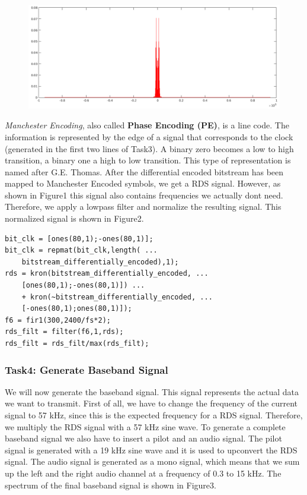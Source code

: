 \documentclass[sigconf]{acmart}
\begin{document}
\begin{figure}[tb!]
	\includegraphics[width=1\linewidth]{rds_filt_plot.png}
	\caption{}
	\label{fig:rds_filt_plot}
\end{figure}

\emph{Manchester Encoding}, also called
\protect\hypertarget{Phaseux20Encodingux20ux28PEux29}{}{}\textbf{Phase
Encoding (PE)}, is a line code. The information is represented by the
edge of a signal that corresponds to the clock (generated in the first
two lines of Task3). A binary zero becomes a low to high transition, a
binary one a high to low transition. This type of representation is
named after G.E. Thomas. After the differential encoded bitstream has
been mapped to Manchester Encoded symbols, we get a RDS signal. However,
as shown in Figure1 this signal also contains frequencies we actually
dont need. Therefore, we apply a lowpass filter and normalize the
resulting signal. This normalized signal is shown in Figure2.

\begin{verbatim}
bit_clk = [ones(80,1);-ones(80,1)];
bit_clk = repmat(bit_clk,length( ...
    bitstream_differentially_encoded),1);
rds = kron(bitstream_differentially_encoded, ...
    [ones(80,1);-ones(80,1)]) ...
    + kron(~bitstream_differentially_encoded, ...
    [-ones(80,1);ones(80,1)]);
f6 = fir1(300,2400/fs*2);
rds_filt = filter(f6,1,rds);
rds_filt = rds_filt/max(rds_filt);
\end{verbatim}

\hypertarget{Task4:ux20Generateux20Basebandux20Signal}{%
\subsubsection{Task4: Generate Baseband
Signal}\label{Task4:ux20Generateux20Basebandux20Signal}}

We will now generate the baseband signal. This signal represents the
actual data we want to transmit. First of all, we have to change the
frequency of the current signal to 57 kHz, since this is the expected
frequency for a RDS signal. Therefore, we multiply the RDS signal with a
57 kHz sine wave. To generate a complete baseband signal we also have to
insert a pilot and an audio signal. The pilot signal is generated with a
19 kHz sine wave and it is used to upconvert the RDS signal. The audio
signal is generated as a mono signal, which means that we sum up the
left and the right audio channel at a frequency of 0.3 to 15 kHz. The
spectrum of the final baseband signal is shown in Figure3.
\end{document}
